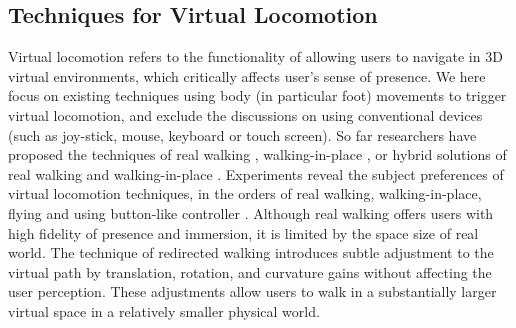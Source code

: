 \documentclass[review]{vgtc}                 %
\begin{document}
\subsection{Techniques for Virtual Locomotion}
Virtual locomotion refers to the functionality of allowing users to navigate in 3D virtual environments, which critically affects user's sense of presence.
We here focus on existing techniques using body (in particular foot) movements to trigger virtual locomotion, and exclude the discussions on using conventional devices (such as joy-stick, mouse, keyboard or touch screen).
So far researchers have proposed the techniques of real walking \cite{usoh1999walking,sun2016mapping,dong2017smooth}, walking-in-place \cite{yan2004new, wendt2010gud, feasel2008llcm, bruno2013new}, or hybrid solutions of real walking and walking-in-place \cite{bhandari2017legomotion,arnskov2018threefold}.
Experiments reveal the subject preferences of virtual locomotion techniques, in the orders of real walking, walking-in-place, flying and using button-like controller \cite{slater1995taking, templeman1999virtual, usoh1999walking}.
Although real walking \cite{usoh1999walking} offers users with high fidelity of presence and immersion, it is limited by the space size of real world.
The technique of redirected walking \cite{sun2016mapping,dong2017smooth} introduces subtle adjustment to the virtual path by translation, rotation, and curvature gains without affecting the user perception.
These adjustments allow users to walk in a substantially larger virtual space in a relatively smaller physical world.
\end{document}
